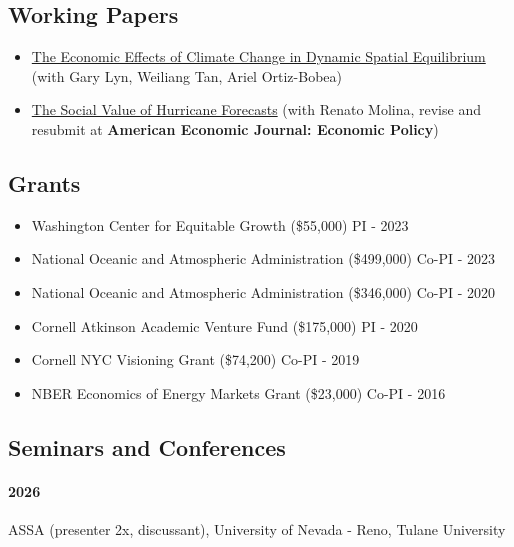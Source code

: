 \documentclass[11pt]{res} %
\begin{document}
\begin{resume}
\vspace{-.2in}


\subsection{Working Papers}

\begin{itemize} %
	\item[] \href{https://osf.io/preprints/socarxiv/usghb}{The Economic Effects of Climate Change in Dynamic Spatial Equilibrium} (with Gary Lyn, Weiliang Tan, Ariel Ortiz-Bobea)
	\item[] \href{https://ivanrudik.com}{The Social Value of Hurricane Forecasts} (with Renato Molina, revise and resubmit at \textbf{American Economic Journal: Economic Policy})
\end{itemize}
 
\vspace{-.2in}

\subsection{Grants}
\begin{itemize}  \itemsep -1pt
	\item[] Washington Center for Equitable Growth (\$55,000) \hfill PI - 2023
	\item[] National Oceanic and Atmospheric Administration (\$499,000) \hfill Co-PI - 2023
	\item[] National Oceanic and Atmospheric Administration (\$346,000) \hfill Co-PI - 2020
	\item[] Cornell Atkinson Academic Venture Fund (\$175,000) \hfill PI - 2020
	\item[] Cornell NYC Visioning Grant (\$74,200) \hfill Co-PI - 2019
	\item[] NBER Economics of Energy Markets Grant (\$23,000) \hfill Co-PI - 2016
\end{itemize}

\vspace{-.2in}

\subsection{Seminars and Conferences}\vspace{-.1in}
\paragraph{2026} ASSA (presenter 2x, discussant), University of Nevada - Reno, Tulane University \vspace{-.2in}

\end{resume}
\end{document}
